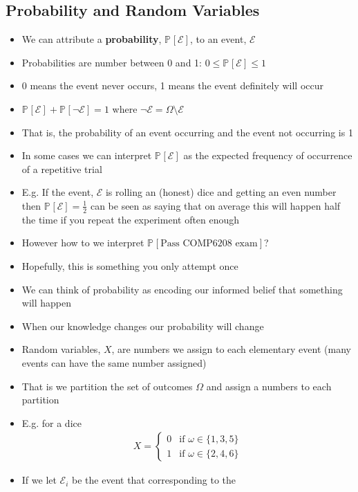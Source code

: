 \documentclass[11pt]{article}
\newcommand{\Prob}[2][]{\mathbb{P}_{#1\!}\left[ #2 \right]}
\begin{document}
\subsection{Probability and Random Variables}
\label{sec:org1875892}
\begin{itemize}
\item We can attribute a \textbf{probability},  \(\Prob{\mathcal{E}}\), to an event,
\(\mathcal{E}\)
\item Probabilities are number between 0 and 1: \(0\leq
     \Prob{\mathcal{E}} \leq 1\)
\item 0 means the event never occurs, 1 means the event definitely will occur
\item \(\Prob{\mathcal{E}} + \Prob{\neg\mathcal{E}} = 1\) where
\(\neg\mathcal{E} = \Omega \setminus \mathcal{E}\)
\item That is, the probability of an event occurring and the event not
occurring is 1
\item In some cases we can interpret \(\Prob{\mathcal{E}}\) as the
expected frequency of occurrence of a repetitive trial
\item E.g. If the event, \(\mathcal{E}\) is rolling an (honest) dice and getting
an even number then \(\Prob{\mathcal{E}}=\tfrac{1}{2}\) can be seen
as saying that on average this will happen half the time if you
repeat the experiment often enough
\item However how to we interpret \(\Prob{\text{Pass COMP6208 exam}}\)?
\item Hopefully, this is something you only attempt once
\item We can think of probability as encoding our informed belief that
something will happen
\item When our knowledge changes our probability will change
\item Random variables, \(X\), are numbers we assign to each elementary
event (many events can have the same number assigned)
\item That is we partition the set of outcomes \(\Omega\) and assign a
numbers to each partition
\item E.g. for a dice
\begin{align*}
  X =
  \begin{cases}
    0 & \text{if $\omega\in\{1,3,5\}$}\\
    1 & \text{if $\omega\in\{2,4,6\}$}
  \end{cases}
\end{align*}
\item If we let \(\mathcal{E}_i\) be the event that corresponding to the

\end{itemize}
\end{document}
